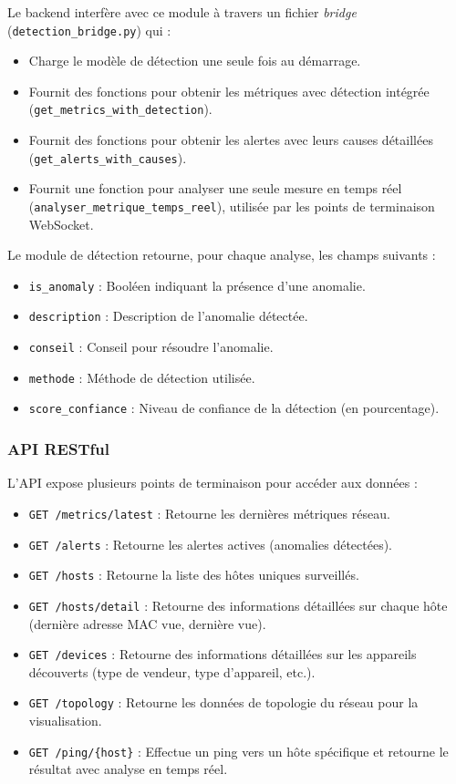 \documentclass[12pt,a4paper]{report}
\begin{document}
Le backend interfère avec ce module à travers un fichier \textit{bridge} (\texttt{detection\_bridge.py}) qui :
\begin{itemize}
    \item Charge le modèle de détection une seule fois au démarrage.
    \item Fournit des fonctions pour obtenir les métriques avec détection intégrée (\texttt{get\_metrics\_with\_detection}).
    \item Fournit des fonctions pour obtenir les alertes avec leurs causes détaillées (\texttt{get\_alerts\_with\_causes}).
    \item Fournit une fonction pour analyser une seule mesure en temps réel (\texttt{analyser\_metrique\_temps\_reel}), utilisée par les points de terminaison WebSocket.
\end{itemize}

Le module de détection retourne, pour chaque analyse, les champs suivants :
\begin{itemize}
    \item \texttt{is\_anomaly} : Booléen indiquant la présence d'une anomalie.
    \item \texttt{description} : Description de l'anomalie détectée.
    \item \texttt{conseil} : Conseil pour résoudre l'anomalie.
    \item \texttt{methode} : Méthode de détection utilisée.
    \item \texttt{score\_confiance} : Niveau de confiance de la détection (en pourcentage).
\end{itemize}

\subsubsection{API RESTful}
L'API expose plusieurs points de terminaison pour accéder aux données :
\begin{itemize}
    \item \texttt{GET /metrics/latest} : Retourne les dernières métriques réseau.
    \item \texttt{GET /alerts} : Retourne les alertes actives (anomalies détectées).
    \item \texttt{GET /hosts} : Retourne la liste des hôtes uniques surveillés.
    \item \texttt{GET /hosts/detail} : Retourne des informations détaillées sur chaque hôte (dernière adresse MAC vue, dernière vue).
    \item \texttt{GET /devices} : Retourne des informations détaillées sur les appareils découverts (type de vendeur, type d'appareil, etc.).
    \item \texttt{GET /topology} : Retourne les données de topologie du réseau pour la visualisation.
    \item \texttt{GET /ping/\{host\}} : Effectue un ping vers un hôte spécifique et retourne le résultat avec analyse en temps réel.
\end{itemize}
\end{document}

